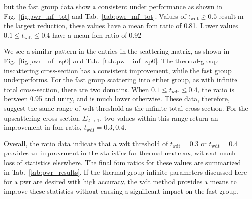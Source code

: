  but the fast group data show a consistent under performance
as shown in Fig.~\ref{fig:pwr_inf_tot} and
Tab.~\ref{tab:pwr_inf_tot}. Values of $t_{\mathrm{wdt}} \geq 0.5$
result in the largest reduction, these values have a mean \gls{fom}
ratio of 0.81. Lower values $0.1 \leq t_{\mathrm{wdt}} \leq 0.4$ have
a mean \gls{fom} ratio of 0.92.

We see a similar pattern in the entries in the scattering matrix, as
shown in Fig.~\ref{fig:pwr_inf_sp0} and
Tab.~\ref{tab:pwr_inf_sp0}. The thermal-group inscattering cross-section
has a consistent improvement, while the fast group underperforms. For
the fast group scattering into either group, as with infinite total
cross-section, there are two domains. When
$0.1 \leq t_{\mathrm{wdt}} \leq 0.4$, the ratio is between 0.95 and
unity, and is much lower otherwise. These data, therefore, suggest the
same range of \gls{wdt} threshold as the infinite total
cross-section. For the upscattering cross-section $\Sigma_{2 \to 1}$,
two values within this range return an improvement in \gls{fom} ratio,
$t_\mathrm{wdt} = 0.3, 0.4$.

Overall, the ratio data indicate that a \gls{wdt} threshold of
$t_{\mathrm{wdt}} = 0.3$ or $t_{\mathrm{wdt}} = 0.4$ provides an
improvement in the statistics for thermal neutrons, without much loss
of statistics elsewhere. The final \gls{fom} ratios for these values
are summarized in Tab.~\ref{tab:pwr_results}. If the thermal group
infinite parameters discussed here for a \gls{pwr} are desired with
high accuracy, the \gls{wdt} method provides a means to improve these
statistics without causing a significant impact on the fast group.

